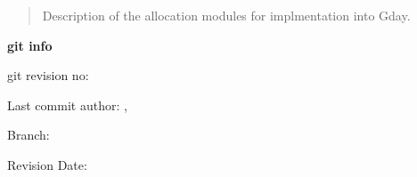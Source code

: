 \begin{minipage}[h]{\textwidth}
	\maketitle
	\center
	\begin{abstract}
		Description of the allocation modules for implmentation into Gday.
	\end{abstract}
	
	\textbf{git info}
	
	git revision no: \gitAbbrevHash
	
	Last commit author: \gitAuthorName,  \gitAuthorEmail
	
	Branch: \gitReferences
	
	Revision Date: \gitAuthorIsoDate 
\end{minipage}
